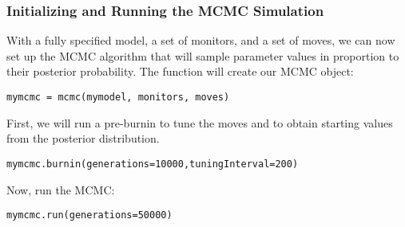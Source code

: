 \subsubsection{Initializing and Running the MCMC Simulation}

With a fully specified model, a set of monitors, and a set of moves, we can now set up the MCMC algorithm that will sample parameter values in proportion to their posterior probability. The  function will create our MCMC object:
{\tt \begin{snugshade*}
\begin{lstlisting}
mymcmc = mcmc(mymodel, monitors, moves)
\end{lstlisting}
\end{snugshade*}}

First, we will run a pre-burnin to tune the moves and to obtain starting values from the posterior distribution.
{\tt \begin{snugshade*}
\begin{lstlisting}
mymcmc.burnin(generations=10000,tuningInterval=200)
\end{lstlisting}
\end{snugshade*}}


Now, run the MCMC:
{\tt \begin{snugshade*}
\begin{lstlisting}
mymcmc.run(generations=50000)
\end{lstlisting}
\end{snugshade*}}











